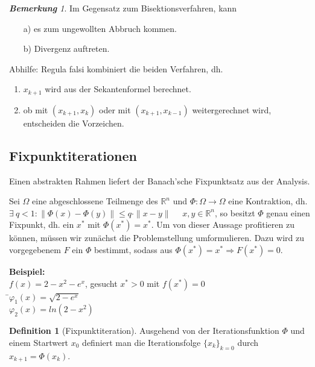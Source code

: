 \documentclass[10pt,a4paper]{article}
\theoremstyle{definition} \newtheorem{definition}{Definition}[section]
\theoremstyle{remark}     \newtheorem*{bemerkung}{\textbf{Bemerkung}} %
\begin{document}
\begin{bemerkung}
Im Gegensatz zum Bisektionsverfahren, kann
\begin{enumerate}
\item[a)] es zum ungewollten Abbruch kommen.
\item[b)] Divergenz auftreten.
\end{enumerate}

Abhilfe: Regula falsi kombiniert die beiden Verfahren, dh.
\begin{enumerate}
\item  $x_{k+1}$ wird aus der Sekantenformel berechnet.
\item  ob mit $(x_{k+1},x_k)$ oder mit $(x_{k+1},x_{k-1})$ weitergerechnet wird, entscheiden die Vorzeichen.
\end{enumerate}
\end{bemerkung}


\subsection{Fixpunktiterationen}

Einen abstrakten Rahmen liefert der Banach'sche Fixpunktsatz aus der Analysis.
\newline

\noindent Sei $\Omega$ eine abgeschlossene Teilmenge des $\mathbb{R}^n$ und $\Phi: \Omega
\longrightarrow \Omega$ eine Kontraktion, dh. $\exists \ q<1: \| \Phi(x) -
\Phi(y)\| \leq q\cdot \|x-y\|$ \ \ $x,y \in \mathbb{R}^n$, so besitzt $\Phi$
genau einen Fixpunkt, dh. ein $x^*$ mit $\Phi(x^*)=x^*$.  Um von dieser Aussage
profitieren zu können, müssen wir zunächst die Problemstellung umformulieren.
Dazu wird zu vorgegebenem $F$ ein $\Phi$ bestimmt, sodass aus $\Phi(x^*)=x^*
\Rightarrow F(x^*)=0$.

\begin{tabbing}
\textbf{Beispiel:}
\\$f(x)=2-x^2-e^x$, gesucht $x^*>0$ mit $f(x^*)=0$\\
\hspace*{8mm} \=$\varphi_1(x)=\sqrt{2-e^x}$\\
\>$\varphi_2(x)=ln(2-x^2)$\\
\end{tabbing}

\begin{definition} [Fixpunktiteration]
Ausgehend von der Iterationsfunktion $\Phi$ und einem Startwert $x_0$ definiert man die Iterationsfolge $\{x_k\}_{k=0}$ durch $x_{k+1}=\Phi(x_k)$.\\
\end{definition}
\end{document}
